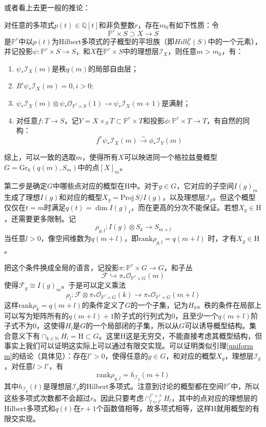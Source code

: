 或者看上去更一般的推论：
\begin{corollary}[\cite{GeometryAlgCurvesII}\uppercase\expandafter{\romannumeral9}.Corollary4.5]\label{uniform m for families}
	对任意的多项式$ p(t)\in \mathbb{Q}[t] $和非负整数$ r $，存在$ m_0 $有如下性质：令
	$$ \mathbb{P}^r\times S\supset X\to S $$
	是$ \mathbb{P}^r $中以$ p(t) $为Hilbert多项式的子概型的平坦族（即$ Hilb_r^p(S) $中的一个元素），并记投影$ \psi :\mathbb{P}^r\times S\to S $，和$ X $在$ \mathbb{P}^r\times S $中的理想层$ \mathscr{I}_X $，则任意$ m>m_0 $，有：
	\begin{enumerate}
		\item $ \psi _*\mathscr{I}_X(m) $是秩$ q(m) $的局部自由层；
		\item $ R^i\psi _*\mathscr{I}_X(m)=0,i>0 $;
		\item $ \psi _*\mathscr{I}_X(m)\otimes \psi _*\mathscr{O}_{\mathbb{P}^r\times S}(1)\to \psi _*\mathscr{I}_X(m+1)$是满射；
		\item 对任意$ f:T\to S $，记$ Y=X\times_S T \subset \mathbb{P}^r\times T $和投影$ \phi : \mathbb{P}^r\times T\to T$，有自然的同构：
		$$ f^*\psi_*\mathscr{I}_X(m)\xrightarrow{\sim}\phi_*\mathscr{I}_Y(m) $$
	\end{enumerate}
\end{corollary}
综上，可以一致的选取$ m $，使得所有$ X $可以映进同一个格拉兹曼概型$ G=\mathrm{Gr}_k(q(m),S_m) $中的点$ [X]_m $。

第二步是确定$ G $中哪些点对应的概型在$ \mathrm{H} $中。对于$g\in G $，它对应的子空间$ I(g)_m $生成了理想$ I(g) $和对应的概型$ X_g=\mathrm{Proj} \,S/I(g) $，以及理想层$ \mathscr{I}_g $。但这个概型仅仅在$ t=m $时满足$ q(t)=\dim I(g)_t $，而在更高的分次不能保证。若想$ X_g \in\mathrm{H}$，还需要更多限制。记
$$ \rho_{g,l}:I(g)\otimes S_k \to S_{m+l} $$
当任意$ l>0 $，像空间维数为$ q(m+l) $，即$ \mathrm{rank}\rho_{g,l}=q(m+l)$
时，才有$ X_g\in\mathrm{H} $。

把这个条件换成全局的语言，记投影$ \pi: \mathbb{P}^r\times G\to G $，和子丛
$$  \mathscr{F}\hookrightarrow \pi_*\mathscr{O}_{\mathbb{P}^r\times G}(m) $$
使得$ \mathscr{F}_{g}\cong I(g)_m $。于是可以定义乘法
$$ \rho_l: \mathscr{F}\otimes\pi_*\mathscr{O}_{\mathbb{P}^r\times G}(k)\to\pi_*\mathscr{O}_{\mathbb{P}^r\times G}(m+l) $$
这样$ \mathrm{rank}\rho_k=q(m+l) $的条件定义了$ G $的一个子集，记为$ H_k $。秩的条件在局部上可以写为矩阵所有的$ q(m+l)+1 $阶子式的行列式为$ 0 $，且至少一个$ q(m+l) $阶子式不为$ 0 $，这使得$ H_l $是$ G $的一个局部闭的子集，所以从$ G $可以诱导概型结构。集合意义下有$ \cap_{k\in \mathbb{N}}H_l=\mathrm{H}\subset G $。这里$ \mathrm{H} $这是无穷交，不能直接考虑其概型结构，但事实上我们可以证明这实际上可以通过有限交实现。可以证明类似引理\ref{uniform m}的结论（具体见\cite{GeometryAlgCurvesII}）：存在$ l'>0 $，使得任意的$ g\in G $，和对应的概型$ X_g $，理想层$ \mathscr{I}_g $，对任意$ l>l' $，有
$$ \mathrm{rank}\rho_{g,l} =h_{\mathscr{I}_g}(m+l)  $$
其中$ h_{\mathscr{I}_g}(t) $是理想层$ \mathscr{I}_g $的Hilbert多项式。注意到讨论的概型都在空间$ \mathbb{P}^r $中，所以这些多项式次数都不会超过$ r $。因此只要考虑$ \cap_{l=l'}^{l'+r}H_l $，其中的点对应的理想层的Hilbert多项式和$ q(t) $在$ r+1 $个函数值相等，故多项式相等，这样$ \mathrm{H} $就用概型的有限交实现。

